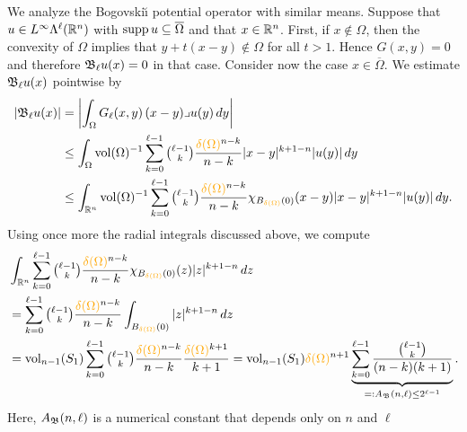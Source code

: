 \documentclass[10pt,letterpaper]{article}
\newcommand\cye[1]{%
  \protect\leavevmode
  \begingroup
    \color{red!35!yellow}%
    #1%
  \endgroup
}
\begin{document}
We analyze the Bogovski\u{\i} potential operator with similar means. 
Suppose that $u \in L^{\infty}\Lambda^{\ell}({\mathbb R}^{n})$ with $\operatorname{supp} u \subseteq \overline\Omega$ and that $x \in {\mathbb R}^{n}$.
First, if $x \notin \Omega$, then the convexity of $\Omega$ implies that $y + t( x - y ) \notin \Omega$ for all $t > 1$. Hence $G(x,y) = 0$ and therefore ${\mathfrak B}_{\ell} u(x) = 0$ in that case.
Consider now the case $x \in \overline\Omega$. 
We estimate ${\mathfrak B}_{\ell} u(x)$ pointwise by 
\begin{align*}
    \left| \Bogov_{\ell} u(x) \right|
    &=
    \left| 
        \int_{\Omega} G_{\ell}(x,y) \,(x-y)\lrcorner u(y)\,dy
    \right| 
    \\&\leq 
    \int_{\Omega} \vol(\Omega)^{-1} \sum_{k=0}^{\ell-1}\tbinom{\ell-1}{k} \frac{ \cye{\diam(\Omega)}^{n-k} }{n-k} |x-y|^{k+1-n} |u(y)| \,dy
    \\&\leq 
    \int_{\bbR^{n}} \vol(\Omega)^{-1} \sum_{k=0}^{\ell-1}\tbinom{\ell-1}{k} \frac{ \cye{\diam(\Omega)}^{n-k} }{n-k} \chi_{B_{\cye{\diam(\Omega)}}(0)}(x-y) |x-y|^{k+1-n} |u(y)| \,dy
    .
\end{align*}
Using once more the radial integrals discussed above, we compute 
\begin{align}
    &
    \int_{\bbR^{n}} \sum_{k=0}^{\ell-1} \tbinom{\ell-1}{k} \frac{ \cye{\diam(\Omega)}^{n-k} }{n-k} \chi_{B_{\cye{\diam(\Omega)}}(0)}(z) |z|^{k+1-n} \,dz
    \nonumber \\&
    =
    \sum_{k=0}^{\ell-1} \tbinom{\ell-1}{k} \frac{ \cye{\diam(\Omega)}^{n-k} }{n-k} \int_{B_{\cye{\diam(\Omega)}}(0)} |z|^{k+1-n} \,dz
    \nonumber \\&
    =
    \vol_{n-1}(S_1) \sum_{k=0}^{\ell-1} \tbinom{\ell-1}{k} \frac{ \cye{\diam(\Omega)}^{n-k} }{n-k} \frac{\cye{\diam(\Omega)}^{k+1}}{k+1}
    =
    \vol_{n-1}(S_1) \cye{\diam(\Omega)}^{n+1} \underbrace{ \sum_{k=0}^{\ell-1} \frac{ \tbinom{\ell-1}{k} }{ (n-k)(k+1) } }_{ =: A_{\Bogov}(n,\ell) \leq 2^{\ell-1}} \label{equation:A_Bogov}
    .
\end{align}
Here, $A_{{\mathfrak B}}(n,\ell)$ is a numerical constant that depends only on $n$ and $\ell$ 
\end{document}
